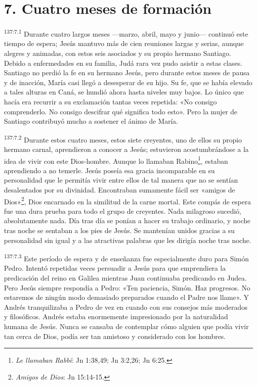 \section*{7. Cuatro meses de formación}
\par
\textsuperscript{137:7.1} Durante cuatro largos meses ---marzo, abril, mayo y junio--- continuó este tiempo de espera; Jesús mantuvo más de cien reuniones largas y serias, aunque alegres y animadas, con estos seis asociados y su propio hermano Santiago. Debido a enfermedades en su familia, Judá rara vez pudo asistir a estas clases. Santiago no perdió la fe en su hermano Jesús, pero durante estos meses de pausa y de inacción, María casi llegó a desesperar de su hijo. Su fe, que se había elevado a tales alturas en Caná, se hundió ahora hasta niveles muy bajos. Lo único que hacía era recurrir a su exclamación tantas veces repetida: «No consigo comprenderlo. No consigo descifrar qué significa todo esto». Pero la mujer de Santiago contribuyó mucho a sostener el ánimo de María.

\par
\textsuperscript{137:7.2} Durante estos cuatro meses, estos siete creyentes, uno de ellos su propio hermano carnal, aprendieron a conocer a Jesús; estuvieron acostumbrándose a la idea de vivir con este Dios-hombre. Aunque lo llamaban Rabino\footnote{\textit{Le llamaban Rabbí}: Jn 1:38,49; Jn 3:2,26; Jn 6:25.}, estaban aprendiendo a no temerle. Jesús poseía esa gracia incomparable en su personalidad que le permitía vivir entre ellos de tal manera que no se sentían desalentados por su divinidad. Encontraban sumamente fácil ser «amigos de Dios»\footnote{\textit{Amigos de Dios}: Jn 15:14-15.}, Dios encarnado en la similitud de la carne mortal. Este compás de espera fue una dura prueba para todo el grupo de creyentes. Nada milagroso sucedió, absolutamente nada. Día tras día se ponían a hacer su trabajo ordinario, y noche tras noche se sentaban a los pies de Jesús. Se mantenían unidos gracias a su personalidad sin igual y a las atractivas palabras que les dirigía noche tras noche.

\par
\textsuperscript{137:7.3} Este período de espera y de enseñanza fue especialmente duro para Simón Pedro. Intentó repetidas veces persuadir a Jesús para que emprendiera la predicación del reino en Galilea mientras Juan continuaba predicando en Judea. Pero Jesús siempre respondía a Pedro: «Ten paciencia, Simón. Haz progresos. No estaremos de ningún modo demasiado preparados cuando el Padre nos llame». Y Andrés tranquilizaba a Pedro de vez en cuando con sus consejos más moderados y filosóficos. Andrés estaba enormemente impresionado por la naturalidad humana de Jesús. Nunca se cansaba de contemplar cómo alguien que podía vivir tan cerca de Dios, podía ser tan amistoso y considerado con los hombres.

